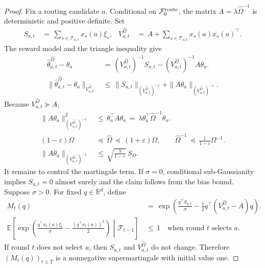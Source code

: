 \documentclass{article} %
\begin{document}
\begin{proof}
Fix a routing candidate \(a\). Conditional on
\(\mathcal F_0^{\rm route}\), the matrix
\(A=\lambda\widehat\Omega^{-1}\) is deterministic and positive definite. Set
\begin{equation}
\begin{aligned}
S_{a,t}
&\,=\,
\sum_{s\in\mathcal{T}_{a,t}}x_s(a)\xi_s,
&
V_{a,t}^{\widehat\Omega}
&\,=\,
A+\sum_{s\in\mathcal{T}_{a,t}}x_s(a)x_s(a)^\top.
\end{aligned}
\end{equation}
The reward model and the triangle inequality give
\begin{equation}
\begin{aligned}
\widehat\theta_{a,t}^{\widehat\Omega}-\theta_a
&\,=\,
(V_{a,t}^{\widehat\Omega})^{-1}S_{a,t}
-
(V_{a,t}^{\widehat\Omega})^{-1}A\theta_a.
\\
\|\widehat\theta_{a,t}^{\widehat\Omega}-\theta_a\|_{V_{a,t}^{\widehat\Omega}}
&\,\leq\,
\|S_{a,t}\|_{(V_{a,t}^{\widehat\Omega})^{-1}}
+
\|A\theta_a\|_{(V_{a,t}^{\widehat\Omega})^{-1}}.
\end{aligned}
\end{equation}
Because \(V_{a,t}^{\widehat\Omega}\succeq A\),
\begin{equation}
\begin{aligned}
\|A\theta_a\|_{(V_{a,t}^{\widehat\Omega})^{-1}}^2
&\,\leq\,
\theta_a^\top A\theta_a
\,=\,
\lambda\theta_a^\top\widehat\Omega^{-1}\theta_a.
\\
(1-\varepsilon)\Omega
&\,\preceq\,
\widehat\Omega
\,\preceq\,
(1+\varepsilon)\Omega,
\qquad
\widehat\Omega^{-1}
\,\preceq\,
\frac{1}{1-\varepsilon}\Omega^{-1}.
\\
\|A\theta_a\|_{(V_{a,t}^{\widehat\Omega})^{-1}}
&\,\leq\,
\sqrt{\frac{\lambda}{1-\varepsilon}}\,S_\Omega.
\end{aligned}
\end{equation}
It remains to control the martingale term. If \(\sigma=0\), conditional
sub-Gaussianity implies \(S_{a,t}=0\) almost surely and the claim follows from
the bias bound. Suppose \(\sigma>0\). For fixed \(q\in\mathbb{R}^d\),
define
\begin{equation}
\begin{aligned}
M_t(q)
&\,=\,
\exp\!\left(
\frac{q^\top S_{a,t}}{\sigma}
-
\frac{1}{2}
q^\top
\left(V_{a,t}^{\widehat\Omega}-A\right)
q
\right).
\\
\mathbb E\!\left[
\exp\!\left(
\frac{q^\top x_t(a)\xi_t}{\sigma}
-\frac{(q^\top x_t(a))^2}{2}
\right)
\middle|\mathcal F_{t-1}
\right]
&\,\leq\,
1
\quad\text{when round \(t\) selects \(a\)}.
\end{aligned}
\end{equation}
If round \(t\) does not select \(a\), then \(S_{a,t}\) and
\(V_{a,t}^{\widehat\Omega}\) do not change. Therefore
\((M_t(q))_{t\le T}\) is a nonnegative supermartingale with initial value one.


\end{proof}
\end{document}
